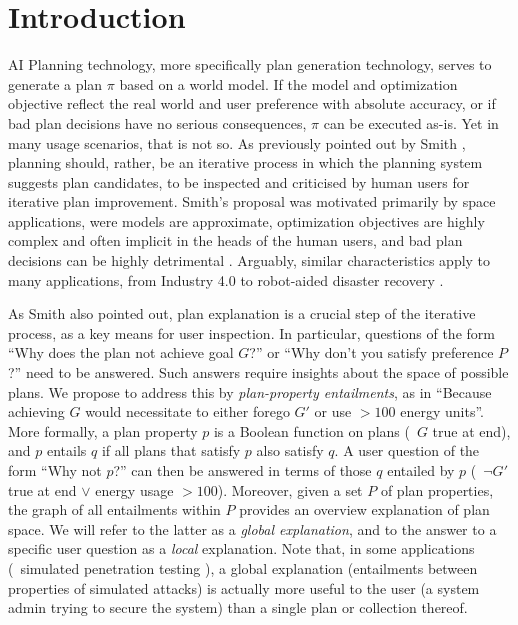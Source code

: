 \section{Introduction}
\label{introduction}

AI Planning technology, more specifically plan generation technology,
serves to generate a plan $\pi$ based on a world model. If the model
and optimization objective reflect the real world and user preference
with absolute accuracy, or if bad plan decisions have no serious
consequences, $\pi$ can be executed as-is. Yet in many usage
scenarios, that is not so. As previously pointed out by Smith
, planning should, rather, be an iterative
process in which the planning system suggests plan candidates, to be
inspected and criticised by human users for iterative plan
improvement. Smith's proposal was motivated primarily by space
applications, were models are approximate, optimization objectives are
highly complex and often implicit in the heads of the human users, and
bad plan decisions can be highly detrimental
\cite{citationsforthis?}. Arguably, similar characteristics apply to
many applications, from Industry 4.0 to robot-aided disaster recovery
\cite{citationsforthis?}.

As Smith also pointed out, plan explanation is a crucial step of the
iterative process, as a key means for user inspection. In particular,
questions of the form ``Why does the plan not achieve goal $G$?'' or
``Why don't you satisfy preference $P$?'' need to be answered. Such
answers require insights about the space of possible plans. We propose
to address this by \emph{plan-property entailments}, as in ``Because
achieving $G$ would necessitate to either forego $G'$ or use $> 100$
energy units''. More formally, a plan property $p$ is a Boolean
function on plans (\eg\ $G$ true at end), and $p$ entails $q$ if all
plans that satisfy $p$ also satisfy $q$.  A user question of the form
``Why not $p$?'' can then be answered in terms of those $q$ entailed
by $p$ (\eg\ $\neg G'$ true at end $\vee$ energy usage $>
100$). Moreover, given a set $P$ of plan properties, the graph of all
entailments within $P$ provides an overview explanation of plan
space. We will refer to the latter as a \emph{global explanation}, and
to the answer to a specific user question as a \emph{local}
explanation. Note that, in some applications (\eg\ simulated
penetration testing \cite{boddy:etal:icaps-05,hoffmann:icaps-15}), a
global explanation (entailments between properties of simulated
attacks) is actually more useful to the user (a system admin trying to
secure the system) than a single plan or collection thereof.

